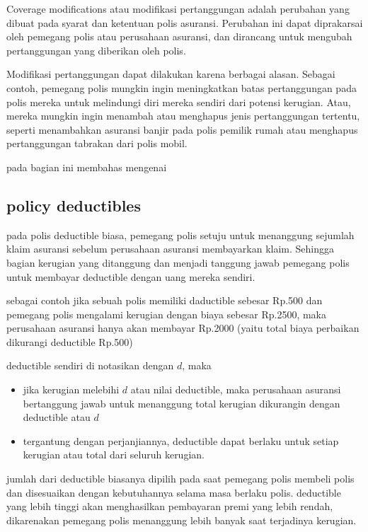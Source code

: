 \documentclass[
]{book}
\begin{document}
Coverage modifications atau modifikasi pertanggungan adalah perubahan yang dibuat pada syarat dan ketentuan polis asuransi. Perubahan ini dapat diprakarsai oleh pemegang polis atau perusahaan asuransi, dan dirancang untuk mengubah pertanggungan yang diberikan oleh polis.

Modifikasi pertanggungan dapat dilakukan karena berbagai alasan. Sebagai contoh, pemegang polis mungkin ingin meningkatkan batas pertanggungan pada polis mereka untuk melindungi diri mereka sendiri dari potensi kerugian. Atau, mereka mungkin ingin menambah atau menghapus jenis pertanggungan tertentu, seperti menambahkan asuransi banjir pada polis pemilik rumah atau menghapus pertanggungan tabrakan dari polis mobil.

pada bagian ini membahas mengenai

\hypertarget{policy-deductibles}{%
\subsection{policy deductibles}\label{policy-deductibles}}

pada polis deductible biasa, pemegang polis setuju untuk menanggung sejumlah klaim asuransi sebelum perusahaan asuransi membayarkan klaim. Sehingga bagian kerugian yang ditanggung dan menjadi tanggung jawab pemegang polis untuk membayar deductible dengan uang mereka sendiri.

sebagai contoh jika sebuah polis memiliki daductible sebesar Rp.500 dan pemegang polis mengalami kerugian dengan biaya sebesar Rp.2500, maka perusahaan asuransi hanya akan membayar Rp.2000 (yaitu total biaya perbaikan dikurangi deductible Rp.500)

deductible sendiri di notasikan dengan \(d\), maka

\begin{itemize}
\item
  jika kerugian melebihi \(d\) atau nilai deductible, maka perusahaan asuransi bertanggung jawab untuk menanggung total kerugian dikurangin dengan deductible atau \(d\)
\item
  tergantung dengan perjanjiannya, deductible dapat berlaku untuk setiap kerugian atau total dari seluruh kerugian.
\end{itemize}

jumlah dari deductible biasanya dipilih pada saat pemegang polis membeli polis dan disesuaikan dengan kebutuhannya selama masa berlaku polis. deductible yang lebih tinggi akan menghasilkan pembayaran premi yang lebih rendah, dikarenakan pemegang polis menanggung lebih banyak saat terjadinya kerugian.
\end{document}
